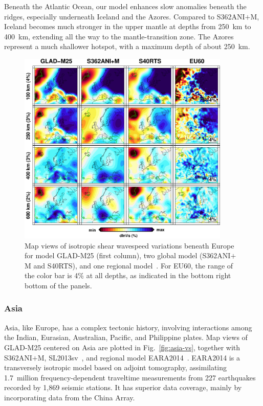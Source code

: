 \documentclass[extra,mreferee]{gji}
\begin{document}
Beneath the Atlantic Ocean, our model enhances slow anomalies beneath the
ridges, especially underneath Iceland and the Azores.
Compared to S362ANI$+$M, Iceland becomes much stronger in the upper mantle at
depths from 250~km to 400~km, extending all the way to the mantle-transition zone.
The Azores represent a much shallower hotspot, with a maximum depth of about 250~km.

\begin{figure}
\includegraphics[width=0.9\textwidth]{figures/depth_slice/europe_vs.pdf}
  \caption{Map views of isotropic shear wavespeed variations beneath Europe for model GLAD-M25 (first column), two global model (S362ANI$+$M and S40RTS), and
  one regional model~\citep[EU60;][]{zhu2015seismic}. For EU60, the range of the color
  bar is 4\% at all depths, as indicated in the bottom right bottom of the panels.}
\label{fig:europe-vs}
\centering
\end{figure}

\subsubsection{Asia}

Asia, like Europe, has a complex tectonic history, involving
interactions among the Indian, Eurasian, Australian, Pacific, and Philippine
plates.
Map views of GLAD-M25 centered on Asia are plotted in Fig.~\ref{fig:asia-vs},
together with S362ANI$+$M, SL2013sv~\citep{SchaefferLebedev13}, and regional model EARA2014~\citep{chen2015multiparameter}.
EARA2014 is a transversely isotropic model based on adjoint
tomography, assimilating 1.7~million frequency-dependent traveltime
measurements from 227 earthquakes recorded by 1,869 seismic stations.
It has superior data coverage, mainly by incorporating data from the China Array.
\end{document}
